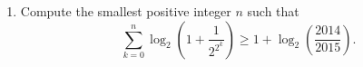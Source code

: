 \documentclass[9pt]{article}
\begin{document}
\begin{enumerate}
$$\begin{tabular}{|c|c|c|}
         \end{tabular}
      $$
      we see that the terms $a_5$, $a_6$, $\cdots$, $a_{13}$ repeat. We observe
      that there are 9 terms from $a_5$ to $a_{13}$ and that their sum is 21.
      Thus
      \begin{align*}
         \sum_{i=1}^{1000} a_i &= \sum_{i=1}^{4} a_i + \sum_{i=5}^{994} a_i +
            \sum_{i=995}^{1000} a_i \\
            &= 5 + 21 \cdot 110 + 14 \\
            &= 2329.
      \end{align*}
   \item Compute the smallest positive integer $n$ such that
         \begin{equation} \label{8_1}
            \sum_{k=0}^n\log_2\left(1 + \frac{1}{2^{2^k}}\right) \ge 1 +
              \log_2\left(\frac{2014}{2015}\right).
         \end{equation}
              

\end{enumerate}
\end{document}
